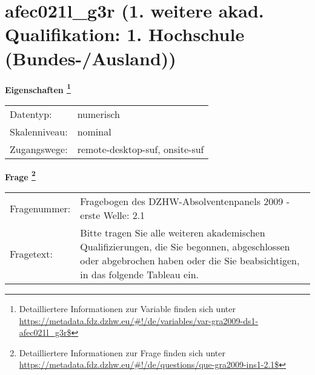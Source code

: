 
    \setcounter{footnote}{0}

    \vspace*{-1.8cm}
	\section{afec021l\_g3r (1. weitere akad. Qualifikation: 1. Hochschule (Bundes-/Ausland))}
	\label{section:afec021l_g3r}



    \vspace*{0.5cm}
    \noindent\textbf{Eigenschaften
	\footnote{Detailliertere Informationen zur Variable finden sich unter
		\url{https://metadata.fdz.dzhw.eu/\#!/de/variables/var-gra2009-ds1-afec021l_g3r$}}}\\
	\begin{tabularx}{\hsize}{@{}lX}
	Datentyp: & numerisch \\
	Skalenniveau: & nominal \\
	Zugangswege: &
	  remote-desktop-suf, 
	  onsite-suf
 \\
    \end{tabularx}



				\vspace*{0.5cm}
                \noindent\textbf{Frage
	                \footnote{Detailliertere Informationen zur Frage finden sich unter
		              \url{https://metadata.fdz.dzhw.eu/\#!/de/questions/que-gra2009-ins1-2.1$}}}\\
				\begin{tabularx}{\hsize}{@{}lX}
					Fragenummer: &
					  Fragebogen des DZHW-Absolventenpanels 2009 - erste Welle:
					  2.1
 \\
					Fragetext: & Bitte tragen Sie alle weiteren akademischen Qualifizierungen, die Sie begonnen, abgeschlossen oder abgebrochen haben oder die Sie beabsichtigen, in das folgende Tableau ein. \\
				\end{tabularx}





